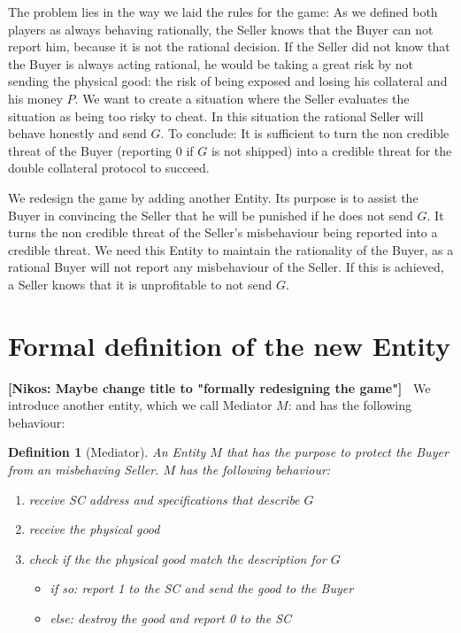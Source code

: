 \documentclass{cacthesis}
\newcommand{\authnote}[3]{{ \footnotesize \textbf{#1[#2: #3]~}}}
\newcommand{\niknote}[1]{\authnote{\color{red}}{Nikos}{#1}}
\newtheorem{definition}{Definition}
\begin{document}
The problem lies in the way we laid the rules for the game: As we defined both players as always behaving rationally, the Seller knows that the Buyer can not report him, because it is not the rational decision.
If the Seller did not know that the Buyer is always acting rational, he would be taking a great risk by not sending the physical good: the risk of being exposed and losing his collateral and his money $P$.
We want to create a situation where the Seller evaluates the situation as being too risky to cheat. In this situation the rational Seller will behave honestly and  send $G$.
To conclude: It is sufficient to turn the non credible threat of the Buyer (reporting 0 if $G$ is not shipped) into a credible threat for the double collateral protocol to succeed.\newline

We redesign the game by adding another Entity. Its purpose is to assist the Buyer in convincing the Seller that he will be punished if he does not send $G$. It turns the non credible threat of the Seller's misbehaviour being reported into a credible threat. We need this Entity to maintain the rationality of the Buyer, as a rational Buyer will not report any misbehaviour of the Seller.
If this is achieved, a Seller knows that it is unprofitable to not send $G$.\newline


\section{Formal definition of the new Entity}
\label{sec:formal-definition-mediator}
\niknote{Maybe change title to "formally redesigning the game"}
We introduce another entity, which we call Mediator $M$: and has the following behaviour:
\begin{definition}[Mediator]
\label{def:mediator}
An Entity $M$ that has the purpose to protect the Buyer from an misbehaving Seller. $M$ has the following behaviour:
\begin{enumerate}
    \item receive SC address and specifications that describe $G$
    \item receive the physical good
    \item check if the the physical good match the description for $G$
    \begin{itemize}
        \item if so: report 1 to the SC and send the good to the Buyer
        \item else: destroy the good and report 0 to the SC
    \end{itemize}
\end{enumerate}
\end{definition}
\end{document}
